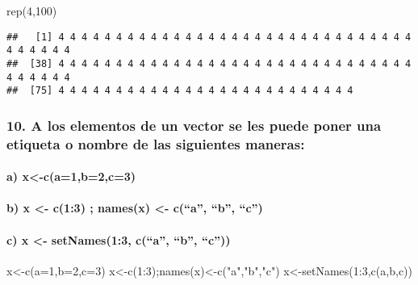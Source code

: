 \documentclass[
]{article}
\newenvironment{Shaded}{\begin{snugshade}}{\end{snugshade}}
\newcommand{\AttributeTok}[1]{\textcolor[rgb]{0.77,0.63,0.00}{#1}}
\newcommand{\DecValTok}[1]{\textcolor[rgb]{0.00,0.00,0.81}{#1}}
\newcommand{\FunctionTok}[1]{\textcolor[rgb]{0.00,0.00,0.00}{#1}}
\newcommand{\NormalTok}[1]{#1}
\newcommand{\OtherTok}[1]{\textcolor[rgb]{0.56,0.35,0.01}{#1}}
\newcommand{\SpecialCharTok}[1]{\textcolor[rgb]{0.00,0.00,0.00}{#1}}
\newcommand{\StringTok}[1]{\textcolor[rgb]{0.31,0.60,0.02}{#1}}
\begin{document}
\begin{Shaded}
\begin{Highlighting}[]
\FunctionTok{rep}\NormalTok{(}\DecValTok{4}\NormalTok{,}\DecValTok{100}\NormalTok{)}
\end{Highlighting}
\end{Shaded}

\begin{verbatim}
##   [1] 4 4 4 4 4 4 4 4 4 4 4 4 4 4 4 4 4 4 4 4 4 4 4 4 4 4 4 4 4 4 4 4 4 4 4 4 4
##  [38] 4 4 4 4 4 4 4 4 4 4 4 4 4 4 4 4 4 4 4 4 4 4 4 4 4 4 4 4 4 4 4 4 4 4 4 4 4
##  [75] 4 4 4 4 4 4 4 4 4 4 4 4 4 4 4 4 4 4 4 4 4 4 4 4 4 4
\end{verbatim}

\hypertarget{a-los-elementos-de-un-vector-se-les-puede-poner-una-etiqueta-o-nombre-de-las-siguientes-maneras}{%
\subsubsection{10. A los elementos de un vector se les puede poner una
etiqueta o nombre de las siguientes
maneras:}\label{a-los-elementos-de-un-vector-se-les-puede-poner-una-etiqueta-o-nombre-de-las-siguientes-maneras}}

\hypertarget{a-x-ca1b2c3}{%
\paragraph{a) x\textless-c(a=1,b=2,c=3)}\label{a-x-ca1b2c3}}

\hypertarget{b-x---c13-namesx---ca-b-c}{%
\paragraph{b) x \textless- c(1:3) ; names(x) \textless- c(``a'', ``b'',
``c'')}\label{b-x---c13-namesx---ca-b-c}}

\hypertarget{c-x---setnames13-ca-b-c}{%
\paragraph{c) x \textless- setNames(1:3, c(``a'', ``b'',
``c''))}\label{c-x---setnames13-ca-b-c}}

\begin{Shaded}
\begin{Highlighting}[]
\NormalTok{x}\OtherTok{\textless{}{-}}\FunctionTok{c}\NormalTok{(}\AttributeTok{a=}\DecValTok{1}\NormalTok{,}\AttributeTok{b=}\DecValTok{2}\NormalTok{,}\AttributeTok{c=}\DecValTok{3}\NormalTok{)}
\NormalTok{x}\OtherTok{\textless{}{-}}\FunctionTok{c}\NormalTok{(}\DecValTok{1}\SpecialCharTok{:}\DecValTok{3}\NormalTok{);}\FunctionTok{names}\NormalTok{(x)}\OtherTok{\textless{}{-}}\FunctionTok{c}\NormalTok{(}\StringTok{"a"}\NormalTok{,}\StringTok{"b"}\NormalTok{,}\StringTok{"c"}\NormalTok{)}
\NormalTok{x}\OtherTok{\textless{}{-}}\FunctionTok{setNames}\NormalTok{(}\DecValTok{1}\SpecialCharTok{:}\DecValTok{3}\NormalTok{,}\FunctionTok{c}\NormalTok{(}\StringTok{\textquotesingle{}a\textquotesingle{}}\NormalTok{,}\StringTok{\textquotesingle{}b\textquotesingle{}}\NormalTok{,}\StringTok{\textquotesingle{}c\textquotesingle{}}\NormalTok{))}
\end{Highlighting}
\end{Shaded}
\end{document}
